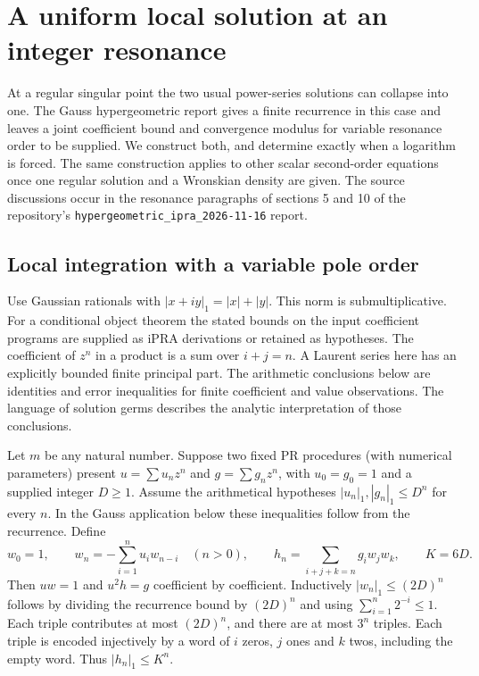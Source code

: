 \section{A uniform local solution at an integer resonance}
\label{sec:resonance}

At a regular singular point the two usual power-series solutions can collapse
into one. The Gauss hypergeometric report gives a finite recurrence in this
case and leaves a joint coefficient bound and convergence modulus for variable
resonance order to be supplied. We construct both, and determine exactly when
a logarithm is forced. The same construction applies to other scalar
second-order equations once one regular solution and a Wronskian density are
given. The source discussions occur in the resonance paragraphs of sections 5
and 10 of the repository's \texttt{hypergeometric\_ipra\_2026-11-16} report.

\subsection{Local integration with a variable pole order}
Use Gaussian rationals with $|x+iy|_1=|x|+|y|$. This norm is
submultiplicative. For a conditional object theorem the stated bounds on the input coefficient programs are supplied as iPRA derivations or retained as hypotheses. The coefficient of $z^n$ in a product is a sum over
$i+j=n$. A Laurent series here has an explicitly bounded finite principal
part. The arithmetic conclusions below are identities and error inequalities
for finite coefficient and value observations. The language of solution
germs describes the analytic interpretation of those conclusions.

Let $m$ be any natural number. Suppose two fixed PR procedures
(with numerical parameters) present $u=\sum u_nz^n$ and $g=\sum g_nz^n$,
with $u_0=g_0=1$ and a supplied integer $D\ge1$. Assume the arithmetical
hypotheses $|u_n|_1,|g_n|_1\le D^n$ for every $n$. In the Gauss
application below these inequalities follow from the recurrence. Define
\[
 w_0=1,\qquad w_n=-\sum_{i=1}^n u_iw_{n-i}\quad(n>0),\qquad
 h_n=\sum_{i+j+k=n}g_iw_jw_k,\qquad K=6D .
\]
Then $uw=1$ and $u^2h=g$ coefficient by coefficient. Inductively
$|w_n|_1\le(2D)^n$ follows by dividing the recurrence bound by $(2D)^n$ and using $\sum_{i=1}^n 2^{-i}\le1$. Each triple contributes at most
$(2D)^n$, and there are at most $3^n$ triples. Each triple is encoded
injectively by a word of $i$ zeros, $j$ ones and $k$ twos, including
the empty word. Thus $|h_n|_1\le K^n$.

